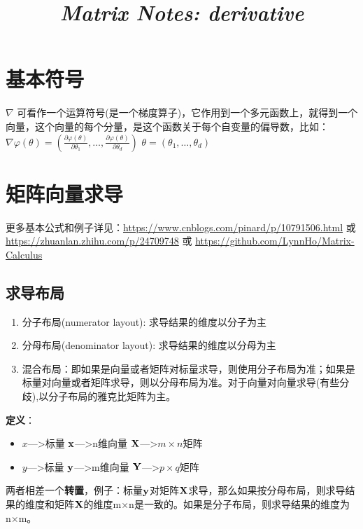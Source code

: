 \documentclass[UTF8]{article}
\title{
    \begin{center}{\Huge \textit{Matrix Notes: derivative}}
    \end{center}}
\begin{document}
    \maketitle
    \tableofcontents

    \newpage

    \section{基本符号}
    $\nabla$ 可看作一个运算符号(是一个梯度算子)，它作用到一个多元函数上，就得到一个向量，这个向量的每个分量，是这个函数关于每个自变量的偏导数，比如：
    \\
    $\nabla \varphi(\theta)=\left(\frac{\partial \varphi(\theta)}{\partial \theta_{1}}, \ldots, \frac{\partial \varphi(\theta)}{\partial \theta_{d}}\right)$
    $\theta=\left(\theta_{1}, \ldots, \theta_{d}\right)$

    \section{矩阵向量求导}
    更多基本公式和例子详见：\url{https://www.cnblogs.com/pinard/p/10791506.html} 或 \url{https://zhuanlan.zhihu.com/p/24709748} 或 \url{https://github.com/LynnHo/Matrix-Calculus}
    \subsection{求导布局}
    \begin{enumerate}
        \item 分子布局(numerator layout): 求导结果的维度以分子为主
        \item 分母布局(denominator layout): 求导结果的维度以分母为主
        \item 混合布局：即如果是向量或者矩阵对标量求导，则使用分子布局为准；如果是标量对向量或者矩阵求导，则以分母布局为准。对于向量对向量求导(有些分歧),以分子布局的雅克比矩阵为主。
    \end{enumerate}
    \textbf{定义}：
    \begin{itemize}
        \item $x$--->标量 \quad $\bf{x}$--->n维向量 \quad $\bf{X}$--->$m \times n$矩阵
        \item $y$--->标量 \quad $\bf{y}$--->m维向量 \quad $\bf{Y}$--->$p \times q$矩阵
    \end{itemize}
    两者相差一个\textbf{转置}，例子：标量$\bf{y}$对矩阵$\bf{X}$求导，那么如果按分母布局，则求导结果的维度和矩阵$\bf{X}$的维度m×n是一致的。如果是分子布局，则求导结果的维度为n×m。
\end{document}
